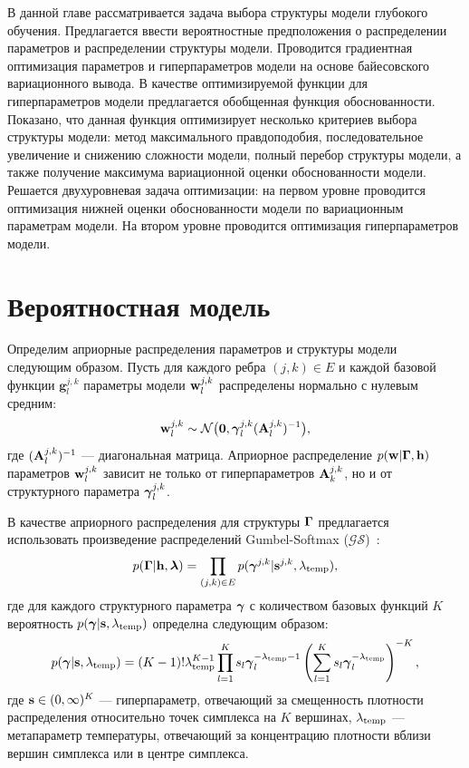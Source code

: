 В данной главе рассматривается задача выбора структуры модели глубокого обучения. Предлагается ввести вероятностные предположения о распределении параметров и распределении структуры модели. 
Проводится градиентная оптимизация параметров и гиперпараметров модели на основе байесовского вариационного вывода.  В качестве оптимизируемой функции для гиперпараметров модели предлагается обобщенная функция обоснованности. Показано, что данная функция оптимизирует несколько критериев выбора структуры модели: метод максимального правдоподобия, последовательное увеличение и снижению сложности модели, полный перебор структуры модели, а также получение максимума вариационной оценки обоснованности модели. Решается двухуровневая задача оптимизации: на первом уровне проводится оптимизация нижней оценки обоснованности модели по вариационным параметрам модели. На втором уровне проводится оптимизация гиперпараметров модели.

\section{Вероятностная модель}
Определим априорные распределения параметров и структуры модели следующим образом.
Пусть для каждого ребра $(j,k) \in E$ и каждой базовой функции $\mathbf{g}^{j,k}_l$ параметры модели $\mathbf{w}^{j,k}_l$ распределены нормально с нулевым средним:
\[
    \mathbf{w}^{j,k}_l \sim \mathcal{N}\bigl(\mathbf{0}, \boldsymbol{\gamma}^{j,k}_l(\mathbf{A}^{j,k}_l)^{-1}\bigr),
\]
где $ (\mathbf{A}^{j,k}_l)^{-1}$ --- диагональная матрица. Априорное распределение $p(\mathbf{w}|\boldsymbol{\Gamma}, \mathbf{h})$ параметров $\mathbf{w}^{j,k}_l$ зависит не только от гиперпараметров $\mathbf{A}_k^{j,k}$, но и от структурного параметра $\boldsymbol{\gamma}^{j,k}_l$.


В качестве априорного распределения для структуры $\boldsymbol{\Gamma}$ предлагается использовать произведение распределений Gumbel-Softmax ($\mathcal{GS}$)~\cite{gs}:
\[
    p(\boldsymbol{\Gamma}|\mathbf{h},\boldsymbol{\lambda}) = \prod_{(j,k) \in E} p(\boldsymbol{\gamma}^{j,k}|\mathbf{s}^{j,k}, \lambda_{\text{temp}}),
\]
где для каждого структурного параметра $\boldsymbol{\gamma}$ с количеством базовых функций $K$ вероятность $p(\boldsymbol{\gamma}|\mathbf{s}, \lambda_{\text{temp}})$ определна следующим образом:
\[
    p(\boldsymbol{\gamma}|\mathbf{s}, \lambda_{\text{temp}}) = (K-1)!\lambda_{\text{temp}}^{K-1}\prod_{l=1}^K s_l\boldsymbol{\gamma}_l^{-\lambda_{\text{temp}} -1} \left(\sum_{l=1}^K s_l\boldsymbol{\gamma}_l^{-\lambda_{\text{temp}}}\right)^{-K},
\]
где $\mathbf{s} \in (0,\infty)^K$ --- гиперпараметр, отвечающий за смещенность плотности распределения относительно точек симплекса на $K$ вершинах, $\lambda_{\text{temp}}$ --- метапараметр температуры, отвечающий за концентрацию плотности вблизи вершин симплекса или в центре симплекса.

